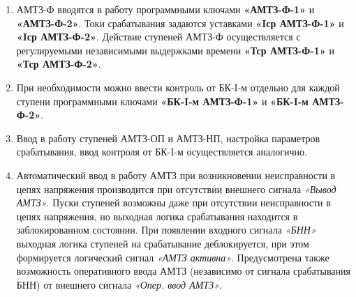 \begin{enumerate}[label=\arabic{section}.\arabic{subsection}.\arabic{enumi}, labelsep=4pt, leftmargin=0pt, itemindent=57pt, itemsep=0pt, parsep=0pt]
\item
АМТЗ-Ф вводятся в работу программными ключами \textbf{«АМТЗ-Ф-1»} и \textbf{«АМТЗ-Ф-2»}. Токи срабатывания задаются уставками \textbf{«Iср АМТЗ-Ф-1»} и \textbf{«Iср АМТЗ-Ф-2»}. Действие ступеней АМТЗ-Ф осуществляется с регулируемыми независимыми выдержками времени \textbf{«Тср АМТЗ-Ф-1»} и \textbf{«Тср АМТЗ-Ф-2»}.

\item
При необходимости можно ввести контроль от БК-I-м отдельно для каждой ступени программными ключами \textbf{«БК-I-м АМТЗ-Ф-1»} и \textbf{«БК-I-м АМТЗ-Ф-2»}.

\item
Ввод в работу ступеней АМТЗ-ОП и АМТЗ-НП, настройка параметров срабатывания, ввод контроля от БК-I-м осуществляется аналогично.

\item
Автоматический ввод в работу АМТЗ при возникновении неисправности в цепях напряжения производится при отсутствии внешнего сигнала \textit{«Вывод АМТЗ»}. Пуски ступеней возможны даже при отсутствии неисправности в цепях напряжения, но выходная логика срабатывания находится в заблокированном состоянии. При появлении входного сигнала \textit{«БНН»} выходная логика ступеней на срабатывание деблокируется, при этом формируется логический сигнал \textit{«АМТЗ активна»}. Предусмотрена также возможность оперативного ввода АМТЗ (независимо от сигнала срабатывания БНН) от внешнего сигнала \textit{«Опер. ввод АМТЗ»}.


\end{enumerate}